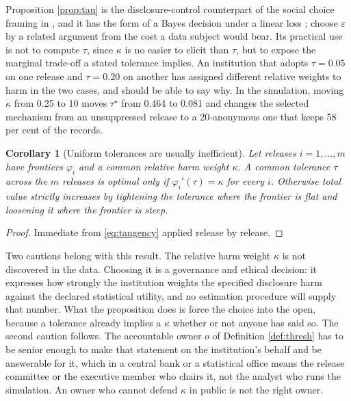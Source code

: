 \documentclass[11pt,a4paper]{article}
\theoremstyle{plain}
\newtheorem{corollary}[proposition]{Corollary}
\theoremstyle{definition}
\theoremstyle{definition}
\theoremstyle{plain}
\begin{document}
Proposition \ref{prop:tau} is the disclosure-control counterpart of the social
choice framing in \citet{abowd2019}, and it has the form of a Bayes decision
under a linear loss \citep{berger1985}; \citet{hsu2014} choose $\varepsilon$ by
a related argument from the cost a data subject would bear. Its practical use is not to compute
$\tau$, since $\kappa$ is no easier to elicit than $\tau$, but to expose the
marginal trade-off a stated tolerance implies. An institution that adopts $\tau =
0.05$ on one release and $\tau = 0.20$ on another has assigned different relative weights to harm
in the two cases, and should be able to say why. In the simulation, moving
$\kappa$ from 0.25 to 10 moves $\tau^\star$ from 0.464 to 0.081 and changes the
selected mechanism from an unsuppressed release to a 20-anonymous one that keeps
58 per cent of the records.

\begin{corollary}[Uniform tolerances are usually inefficient]\label{cor:uniform}
Let releases $i = 1, \dots, m$ have frontiers $\varphi_i$ and a common relative
harm weight $\kappa$. A common tolerance $\tau$ across the $m$ releases is optimal
only if $\varphi_i'(\tau) = \kappa$ for every $i$. Otherwise total value
strictly increases by tightening the tolerance where the frontier is flat and
loosening it where the frontier is steep.
\end{corollary}

\begin{proof}
Immediate from \eqref{eq:tangency} applied release by release.
\end{proof}

Two cautions belong with this result. The relative harm weight $\kappa$ is not
discovered in the data. Choosing it is a governance and ethical decision: it expresses how strongly
the institution weights the specified disclosure harm against the declared
statistical utility, and no estimation procedure
will supply that number. What the proposition does is force the choice into the
open, because a tolerance already implies a $\kappa$ whether or not anyone has
said so. The second caution follows. The accountable owner $o$ of Definition
\ref{def:thresh} has to be senior enough to make that statement on the
institution's behalf and be answerable for it, which in a central bank or a
statistical office means the release committee or the executive member who chairs
it, not the analyst who runs the simulation. An owner who cannot defend $\kappa$
in public is not the right owner.
\end{document}
